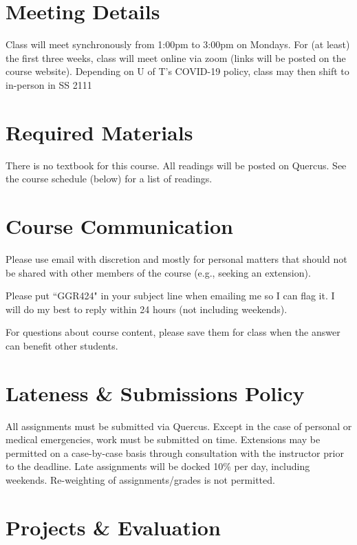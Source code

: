 \documentclass[11pt]{article}
\begin{document}
	\section*{\textsf{Meeting Details}}
	
	Class will meet synchronously from 1:00pm to 3:00pm on Mondays. For (at least) the first three weeks, class will meet online via zoom (links will be posted on the course website). Depending on U of T's COVID-19 policy, class may then shift to in-person in SS 2111

	
	
	\section*{Required Materials}
	
	There is no textbook for this course. All readings will be posted on Quercus. See the course schedule (below) for a list of readings.
	
	
	\section*{Course Communication}
	
	Please use email with discretion and mostly for personal matters that should not be shared with other members of the course (e.g., seeking an extension). 
	
	Please put “GGR424" in your subject line when emailing me so I can flag it. I will do my best to reply within 24 hours (not including weekends).
	
	For questions about course content, please save them for class when the answer can benefit other students. 
	
		
	\section*{Lateness \& Submissions Policy}
	
	All assignments must be submitted via Quercus. Except in the case of personal or medical emergencies, work must be submitted on time. Extensions may be permitted on a case-by-case basis through consultation with the instructor prior to the deadline. Late assignments will be docked 10\% per day, including weekends. Re-weighting of assignments/grades is not permitted.
	
	
	
	
		
	

	\section*{Projects \& Evaluation}
	
\end{document}
